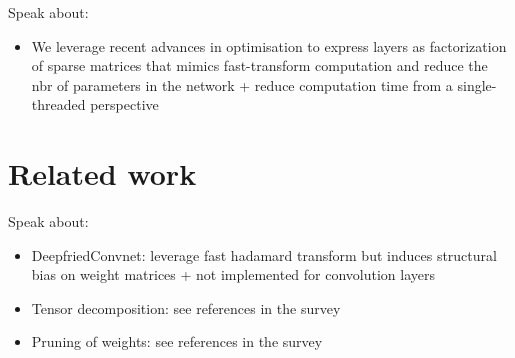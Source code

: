 \documentclass[12pt]{article}
\begin{document}


% 


Speak about:
\begin{itemize}
 \item We leverage recent advances in optimisation to express layers as factorization of sparse matrices that mimics fast-transform computation and reduce the nbr of parameters in the network + reduce computation time from a single-threaded perspective
 
 
\end{itemize}


\section{Related work}\label{sec:related_work}

Speak about:
\begin{itemize}
 \item DeepfriedConvnet: leverage fast hadamard transform but induces structural bias on weight matrices + not implemented for convolution layers
 \item Tensor decomposition: see references in the survey \cite{DBLP:journals/corr/abs-1710-09282}
 \item Pruning of weights: see references in the survey \cite{DBLP:journals/corr/abs-1710-09282}
\end{itemize}
\end{document}
